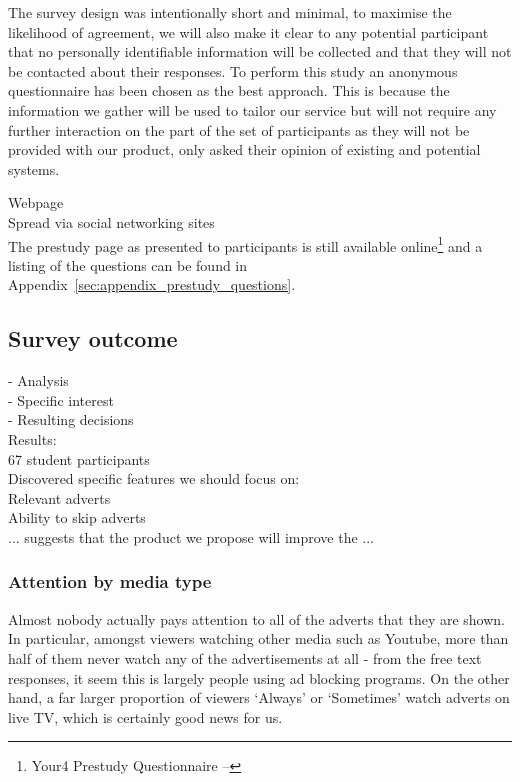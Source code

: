 The survey design was intentionally short and minimal, to maximise the likelihood of agreement, we will also make it clear to any potential participant that no personally identifiable information will be collected and that they will not be contacted about their responses. %
To perform this study an anonymous questionnaire has been chosen as the best approach.
This is because the information we gather will be used to tailor our service but will not require any further interaction on the part of the set of participants as they will not be provided with our product, only asked their opinion of existing and potential systems.


Webpage\\
Spread via social networking sites\\


The prestudy page as presented to participants is still available online\footnote{Your4 Prestudy Questionnaire -- } and a listing of the questions can be found in Appendix~\ref{sec:appendix_prestudy_questions}. %


\subsection{Survey outcome}



 - Analysis\\
  - Specific interest\\
  - Resulting decisions\\

Results:\\
67 student participants\\
Discovered specific features we should focus on:\\
Relevant adverts\\
Ability to skip adverts\\
... suggests that the product we propose will improve the ...

\subsubsection{Attention by media type}
Almost nobody actually pays attention to all of the adverts that they are shown. In particular, amongst viewers watching other media such as Youtube, more than half of them never watch any of the advertisements at all - from the free text responses, it seem this is largely people using ad blocking programs. On the other hand, a far larger proportion of viewers `Always' or `Sometimes' watch adverts on live TV, which is certainly good news for us.

